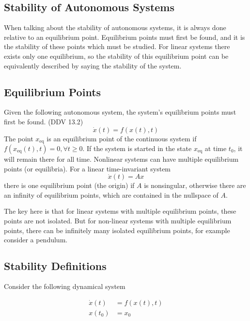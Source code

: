\subsection{Stability of Autonomous Systems}

When talking about the stability of autonomous systems, it is always done relative to an equilibrium point.
Equilibrium points must first be found, and it is the stability of these points which must be studied.
For linear systems there exists only one equilibrium, so the stability of this equilibrium point can be equivalently described by saying the stability of the system.

\subsection{Equilibrium Points}

Given the following autonomous system, the system's equilibrium points must first be found.
(DDV 13.2)
\begin{equation*}
  \dot{x}(t)=f(x(t),t)
\end{equation*}
The point $x_{\text{eq}}$ is an equilibrium point of the continuous system if  $f(x_{\text{eq}}(t),t)=0, \forall t\geq0$.
If the system is started in the state $x_{\text{eq}}$ at time $t_{0}$, it will remain there for all time.
Nonlinear systems can have multiple equilibrium points (or equilibria).
For a linear time-invariant system
\begin{equation*}
  \dot{x}(t)=Ax
\end{equation*}
there is one equilibrium point (the origin) if $A$ is nonsingular, otherwise there are an infinity of equilibrium points, which are contained in the nullspace of $A$.

The key here is that for linear systems with multiple equilibrium points, these points are not isolated.
But for non-linear systems with multiple equilibrium points, there can be infinitely many isolated equilibrium points, for example consider a pendulum.

\subsection{Stability Definitions}

Consider the following dynamical system

\begin{equation*}
  \begin{split}
    \dot{x}(t)&=f(x(t),t) \\
    x(t_{0})&=x_{0}
  \end{split}
\end{equation*}

